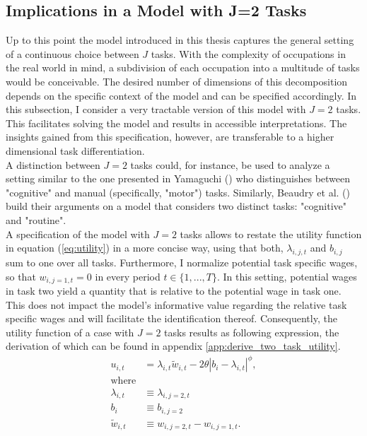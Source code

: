 \documentclass[../main.tex]{subfiles}
\begin{document}
\subsection{Implications in a Model with J=2 Tasks} \label{sec:implications-with-j=2}
Up to this point the model introduced in this thesis captures the general setting of a continuous choice between $J$ tasks. With the complexity of occupations in the real world in mind, a subdivision of each occupation into a multitude of tasks would be conceivable. The desired number of dimensions of this decomposition depends on the specific context of the model and can be specified accordingly. In this subsection, I consider a very tractable version of this model with $J=2$ tasks. This facilitates solving the model and results in accessible interpretations. The insights gained from this specification, however, are transferable to a higher dimensional task differentiation.
\\
A distinction between $J=2$ tasks could, for instance, be used to analyze a setting similar to the one presented in Yamaguchi (\citeyear{yamaguchi2018changes}) who distinguishes between "cognitive" and manual (specifically, "motor") tasks. Similarly, Beaudry et al. (\citeyear{beaudry2016great}) build their arguments on a model that considers two distinct tasks: "cognitive" and "routine". 
\\
A specification of the model with $J=2$ tasks allows to restate the utility function in equation (\ref{eq:utility}) in a more concise way, using that both, $\lambda_{i,j,t}$ and $b_{i,j}$ sum to one over all tasks. Furthermore, I normalize potential task specific wages, so that $w_{i,j=1,t} = 0$  in every period $t \in \{1, ..., T\}$. In this setting, potential wages in task two yield a quantity that is relative to the potential wage in task one. This does not impact the model's informative value regarding the relative task specific wages and will facilitate the identification thereof. Consequently, the utility function of a case with $J=2$ tasks results as following expression, the derivation of which can be found in appendix \ref{app:derive_two_task_utility}.
\begin{align}\label{eq:two_task_utility}
	u_{i,t} 		& = \lambda_{i,t} \tilde{w}_{i,t} - 2 \theta |b_i - \lambda_{i,t}|^\phi,  \\
	\text{where} 	& {} \nonumber \\
	\lambda_{i,t} 	& \equiv \lambda_{i,j=2,t}  \nonumber \\
	b_i 			& \equiv b_{i,j=2} \nonumber \\
	\tilde{w}_{i,t} & \equiv w_{i,j=2,t} - w_{i,j=1,t}. \nonumber
\end{align}
\end{document}
